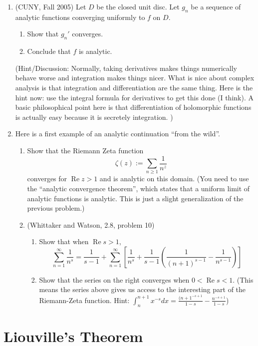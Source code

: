\documentclass[a4paper,10pt]{article}
\renewcommand{\Re}{\operatorname{Re}}
\begin{document}
\begin{enumerate}
	\item (CUNY, Fall 2005)
	Let $D$ be the closed unit disc. 
	Let $g_n$ be a sequence of analytic functions converging uniformly to $f$ on $D$. 
	\begin{enumerate}
		\item Show that $g_n'$ converges.
		\item Conclude that $f$ is analytic.
	\end{enumerate}

(Hint/Discussion: Normally, taking derivatives makes things numerically behave worse and integration makes things nicer. What is nice about complex analysis is that integration and differentiation are the same thing. Here is the hint now: use the integral formula for derivatives to get this done (I think). A basic philosophical point here is that differentiation of holomorphic functions is actually easy because it is secretely integration. )

	\item 
	Here is a first example of an analytic continuation ``from the wild''. 
	\begin{enumerate}
		\item Show that the Riemann Zeta function 
		$$ \zeta(z):=\sum_{n\geq 1} \frac{1}{n^z}$$
		converges for $\Re z > 1$ and is analytic on this domain. (You need to use the ``analytic convergence theorem'', which states that a uniform limit of analytic functions is analytic. This is just a slight generalization of the previous problem.)
		\item (Whittaker and Watson, 2.8, problem 10) 
		\begin{enumerate}
			\item Show that when $\Re s>1$,
			$$ \sum_{n=1}^{\infty} \frac{1}{n^s} = \frac{1}{s-1} + \sum_{n=1}^{\infty} \left[ \frac{1}{n^s} + \frac{1}{s-1} \left( \frac{1}{(n+1)^{s-1}} - \frac{1}{n^{s-1}} \right) \right]$$
			\item Show that the series on the right converges when $0<\Re s<1$. (This means the series above gives us access to the interesting part of the Riemann-Zeta function. Hint: $ \int_n^{n+1} x^{-s}dx = \frac{(n+1^{-s+1}}{1-s} - \frac{n^{-s+1}}{1-s} $)
		\end{enumerate}
	\end{enumerate}

\end{enumerate}

\section{Liouville's Theorem}
\end{document}
